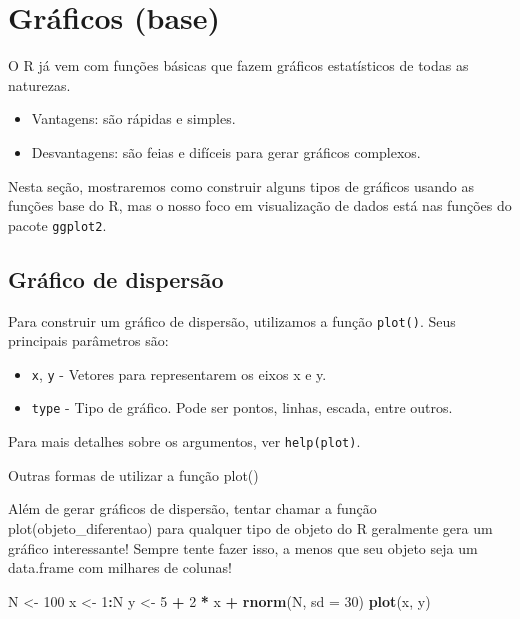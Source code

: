 \documentclass[]{book}
\newenvironment{Shaded}{\begin{snugshade}}{\end{snugshade}}
\newcommand{\DataTypeTok}[1]{\textcolor[rgb]{0.13,0.29,0.53}{#1}}
\newcommand{\DecValTok}[1]{\textcolor[rgb]{0.00,0.00,0.81}{#1}}
\newcommand{\KeywordTok}[1]{\textcolor[rgb]{0.13,0.29,0.53}{\textbf{#1}}}
\newcommand{\NormalTok}[1]{#1}
\newcommand{\OperatorTok}[1]{\textcolor[rgb]{0.81,0.36,0.00}{\textbf{#1}}}
\newcommand{\StringTok}[1]{\textcolor[rgb]{0.31,0.60,0.02}{#1}}
\providecommand{\tightlist}{%
  \setlength{\itemsep}{0pt}\setlength{\parskip}{0pt}}
\begin{document}
\hypertarget{gruxe1ficos-base}{%
\section{Gráficos (base)}\label{gruxe1ficos-base}}

O R já vem com funções básicas que fazem gráficos estatísticos de todas as naturezas.

\begin{itemize}
\tightlist
\item
  Vantagens: são rápidas e simples.
\item
  Desvantagens: são feias e difíceis para gerar gráficos complexos.
\end{itemize}

Nesta seção, mostraremos como construir alguns tipos de gráficos usando as funções base do R, mas o nosso foco em visualização de dados está nas funções do pacote \texttt{ggplot2}.

\hypertarget{gruxe1fico-de-dispersuxe3o}{%
\subsection{Gráfico de dispersão}\label{gruxe1fico-de-dispersuxe3o}}

Para construir um gráfico de dispersão, utilizamos a função \texttt{plot()}. Seus principais parâmetros são:

\begin{itemize}
\tightlist
\item
  \texttt{x}, \texttt{y} - Vetores para representarem os eixos x e y.
\item
  \texttt{type} - Tipo de gráfico. Pode ser pontos, linhas, escada, entre outros.
\end{itemize}

Para mais detalhes sobre os argumentos, ver \texttt{help(plot)}.

Outras formas de utilizar a função plot()

Além de gerar gráficos de dispersão, tentar chamar a função plot(objeto\_diferentao) para qualquer tipo de objeto do R geralmente gera um gráfico interessante! Sempre tente fazer isso, a menos que seu objeto seja um data.frame com milhares de colunas!

\begin{Shaded}
\begin{Highlighting}[]
\NormalTok{N <-}\StringTok{ }\DecValTok{100}
\NormalTok{x <-}\StringTok{ }\DecValTok{1}\OperatorTok{:}\NormalTok{N}
\NormalTok{y <-}\StringTok{ }\DecValTok{5} \OperatorTok{+}\StringTok{ }\DecValTok{2} \OperatorTok{*}\StringTok{ }\NormalTok{x }\OperatorTok{+}\StringTok{ }\KeywordTok{rnorm}\NormalTok{(N, }\DataTypeTok{sd =} \DecValTok{30}\NormalTok{)}
\KeywordTok{plot}\NormalTok{(x, y)}
\end{Highlighting}
\end{Shaded}
\end{document}
